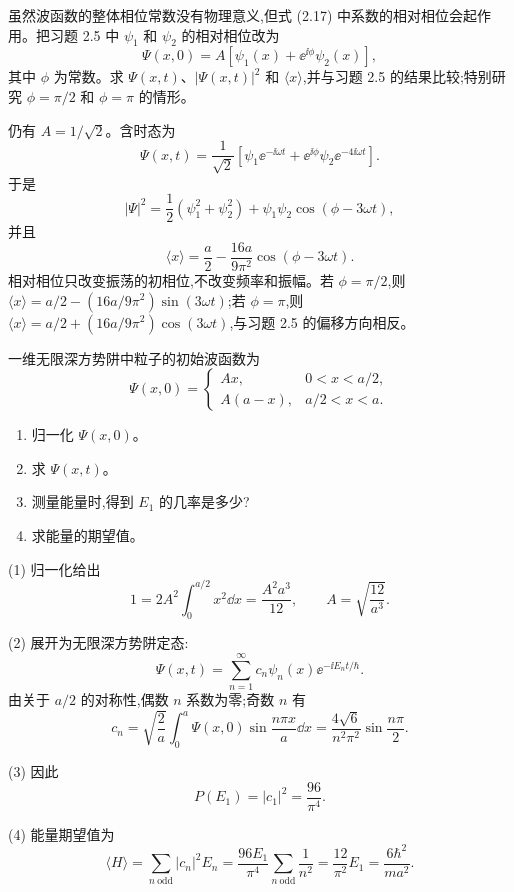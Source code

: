 \begin{question}
虽然波函数的整体相位常数没有物理意义,但式 (2.17) 中系数的相对相位会起作用。把习题 2.5 中 $\psi_1$ 和 $\psi_2$ 的相对相位改为
\[
\Psi(x,0)=A[\psi_1(x)+\ee^{\ii\phi}\psi_2(x)],
\]
其中 $\phi$ 为常数。求 $\Psi(x,t)$、$|\Psi(x,t)|^2$ 和 $\langle x\rangle$,并与习题 2.5 的结果比较;特别研究 $\phi=\pi/2$ 和 $\phi=\pi$ 的情形。

\par\smallskip
{}

\end{question}
\begin{solution}
仍有 $A=1/\sqrt2$。含时态为
\[
\Psi(x,t)=\frac1{\sqrt2}\left[\psi_1\ee^{-\ii\omega t}+\ee^{\ii\phi}\psi_2\ee^{-4\ii\omega t}\right].
\]
于是
\[
|\Psi|^2=\frac12(\psi_1^2+\psi_2^2)+\psi_1\psi_2\cos(\phi-3\omega t),
\]
并且
\[
\langle x\rangle=\frac a2-\frac{16a}{9\pi^2}\cos(\phi-3\omega t).
\]
相对相位只改变振荡的初相位,不改变频率和振幅。若 $\phi=\pi/2$,则 $\langle x\rangle=a/2-(16a/9\pi^2)\sin(3\omega t)$;若 $\phi=\pi$,则 $\langle x\rangle=a/2+(16a/9\pi^2)\cos(3\omega t)$,与习题 2.5 的偏移方向相反。
\end{solution}

\begin{question}
一维无限深方势阱中粒子的初始波函数为
\[
\Psi(x,0)=
\begin{cases}
Ax, & 0<x<a/2,\\
A(a-x), & a/2<x<a.
\end{cases}
\]
\begin{enumerate}
\item 归一化 $\Psi(x,0)$。
\item 求 $\Psi(x,t)$。
\item 测量能量时,得到 $E_1$ 的几率是多少?
\item 求能量的期望值。
\end{enumerate}
\end{question}
\begin{solution}
(1) 归一化给出
\[
1=2A^2\int_0^{a/2}x^2\dd x=\frac{A^2a^3}{12},
\qquad
A=\sqrt{\frac{12}{a^3}}.
\]

(2) 展开为无限深方势阱定态:
\[
\Psi(x,t)=\sum_{n=1}^{\infty}c_n\psi_n(x)\ee^{-\ii E_nt/\hbar}.
\]
由关于 $a/2$ 的对称性,偶数 $n$ 系数为零;奇数 $n$ 有
\[
 c_n=\sqrt{\frac2a}\int_0^a\Psi(x,0)\sin\frac{n\pi x}{a}\dd x
 =\frac{4\sqrt6}{n^2\pi^2}\sin\frac{n\pi}{2}.
\]

(3) 因此
\[
P(E_1)=|c_1|^2=\frac{96}{\pi^4}.
\]

(4) 能量期望值为
\[
\langle H\rangle=\sum_{n\ \mathrm{odd}}|c_n|^2E_n
=\frac{96E_1}{\pi^4}\sum_{n\ \mathrm{odd}}\frac1{n^2}
=\frac{12}{\pi^2}E_1
=\frac{6\hbar^2}{ma^2}.
\]
\end{solution}

